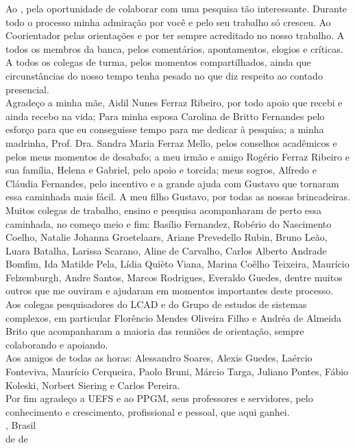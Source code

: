 
\begin{agradecimentos}
Ao \theadvisor, pela oportunidade de colaborar com uma pesquisa tão interessante. Durante todo o processo minha admiração por você e pelo seu trabalho só cresceu. Ao Coorientador \thecoadvisor pelas orientações e por ter sempre acreditado no nosso trabalho. A todos os membros da banca, pelos comentários, apontamentos, elogios e críticas. A todos os colegas de turma, pelos momentos compartilhados, ainda que circunstâncias do nosso tempo tenha pesado no que diz respeito ao contado presencial.
\\
Agradeço a minha mãe, Aidil Nunes Ferraz Ribeiro, por todo apoio que recebi e ainda recebo na vida; Para minha esposa Carolina de Britto Fernandes pelo esforço para que eu conseguisse tempo para me dedicar à pesquisa; a minha madrinha, Prof. Dra. Sandra Maria Ferraz Mello, pelos conselhos acadêmicos e pelos meus momentos de desabafo; a meu irmão e amigo Rogério Ferraz Ribeiro e sua família, Helena e Gabriel, pelo apoio e torcida; meus sogros, Alfredo e Cláudia Fernandes, pelo incentivo e a grande ajuda com Gustavo que tornaram essa caminhada mais fácil. A meu filho Gustavo, por todas as nossas brincadeiras.
\\
Muitos colegas de trabalho, ensino e pesquisa acompanharam de perto essa caminhada, no começo meio e fim: Basílio Fernandez, Robério do Nascimento Coelho, Natalie Johanna Groetelaars, Ariane Prevedello Rubin, Bruno Leão, Luara Batalha, Larissa Scarano, Aline de Carvalho, Carlos Alberto Andrade Bomfim, Ida Matilde Pela, Lídia Quièto Viana, Marina Coêlho Teixeira, Maurício Felzemburgh, Andre Santos, Marcos Rodrigues, Everaldo Guedes, dentre muitos outros que me ouviram e ajudaram em momentos importantes deste processo. Aos colegas pesquisadores do LCAD e do Grupo de estudos de sistemas complexos, em particular Florêncio Mendes Oliveira Filho e Andréa de Almeida Brito que acompanharam a maioria das reuniões de orientação, sempre colaborando e apoiando.
\\
Aos amigos de todas as horas: Alessandro Soares, Alexis Guedes, Laércio Fonteviva, Maurício Cerqueira, Paolo Bruni, Márcio Targa, Juliano Pontes, Fábio Koleski, Norbert Siering e Carlos Pereira.
\\
Por fim agradeço a UEFS e ao PPGM, seus professores e servidores, pelo conhecimento e crescimento, profissional e pessoal, que aqui ganhei.
\\

\noindent
\ppgmcidade, Brasil \hfill \theauthor\\
\ppgmdia\space de \ppgmmes\space de \ppgmano
\end{agradecimentos}
